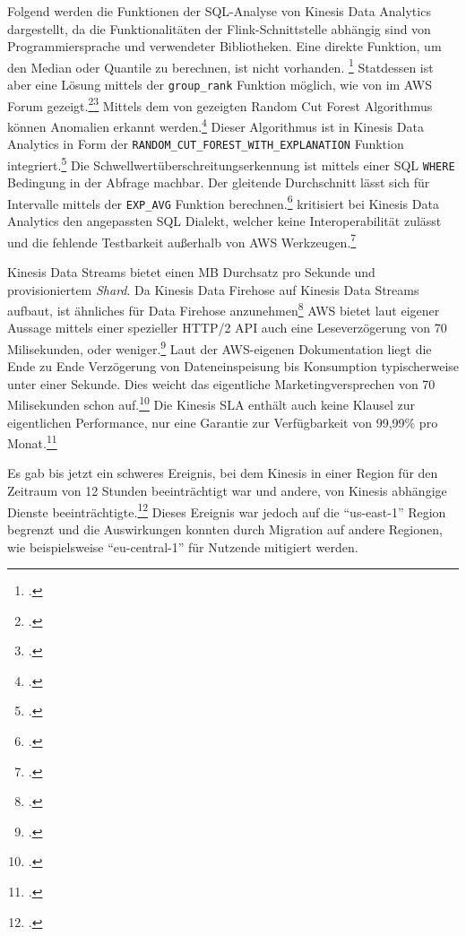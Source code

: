 Folgend werden die Funktionen der \ac{SQL}-Analyse von Kinesis Data Analytics dargestellt, da die Funktionalitäten der Flink-Schnittstelle abhängig sind von Programmiersprache und verwendeter Bibliotheken. 
Eine direkte Funktion, um den Median oder Quantile zu berechnen, ist nicht vorhanden. \footcite[Vgl.][]{RyanN.2018} Statdessen ist aber eine Lösung mittels der \texttt{group_rank} Funktion möglich, wie von \citeauthor{RyanN.2018} im \ac{AWS} Forum gezeigt.\footcite[Vgl.][]{AmazonWebServicesInc..o.J.as}\nzitat\footcite[Vgl.][]{RyanN.2018}
Mittels dem von \citeauthor{Guha.2016} gezeigten Random Cut Forest Algorithmus können Anomalien erkannt werden.\footcite[Vgl.][1]{Guha.2016} Dieser Algorithmus ist in Kinesis Data Analytics in Form der \texttt{RANDOM_CUT_FOREST_WITH_EXPLANATION} Funktion integriert.\footcite[Vgl.][]{AmazonWebServicesInc..o.J.ar}
Die Schwellwertüberschreitungserkennung ist mittels einer \ac{SQL} \texttt{WHERE} Bedingung in der Abfrage machbar.
Der gleitende Durchschnitt lässt sich für Intervalle mittels der \texttt{EXP_AVG} Funktion berechnen.\footcite[Vgl.][]{AmazonWebServicesInc..o.J.aq}
\citeauthor{Herman.2020} kritisiert bei Kinesis Data Analytics den angepassten \ac{SQL} Dialekt, welcher keine Interoperabilität zulässt und die fehlende Testbarkeit außerhalb von \ac{AWS} Werkzeugen.\footcite[Vgl.][]{Herman.2020}

Kinesis Data Streams bietet einen MB Durchsatz pro Sekunde und provisioniertem \textit{Shard}. Da Kinesis Data Firehose auf Kinesis Data Streams aufbaut, ist ähnliches für Data Firehose anzunehmen\footcite[Vgl.][]{Pogosova.28.05.2020} 
\ac{AWS} bietet laut eigener Aussage mittels einer spezieller HTTP/2 \ac{API} auch eine Leseverzögerung von 70 Milisekunden, oder weniger.\footcite[Vgl.][]{AmazonWebServicesInc..o.J.af} 
Laut der \ac{AWS}-eigenen Dokumentation liegt die Ende zu Ende Verzögerung von Dateneinspeisung bis Konsumption typischerweise unter einer Sekunde. Dies weicht das eigentliche Marketingversprechen von 70 Milisekunden schon auf.\footcite[Vgl.][]{AmazonWebServicesInc..o.J.ae}
Die Kinesis \ac{SLA} enthält auch keine Klausel zur eigentlichen Performance, nur eine Garantie zur Verfügbarkeit von 99,99\% pro Monat.\footcite[Vgl.][]{AmazonWebServicesInc..o.J.ad} 

Es gab bis jetzt ein schweres Ereignis, bei dem Kinesis in einer Region für den Zeitraum von 12 Stunden beeinträchtigt war und andere, von Kinesis abhängige Dienste beeinträchtigte.\footcite[Vgl. auch im Folgenden][]{AmazonWebServicesInc..2020e} Dieses Ereignis war jedoch auf die \enquote{us-east-1} Region begrenzt und die Auswirkungen konnten durch Migration auf andere Regionen, wie beispielsweise \enquote{eu-central-1} für Nutzende mitigiert werden.

